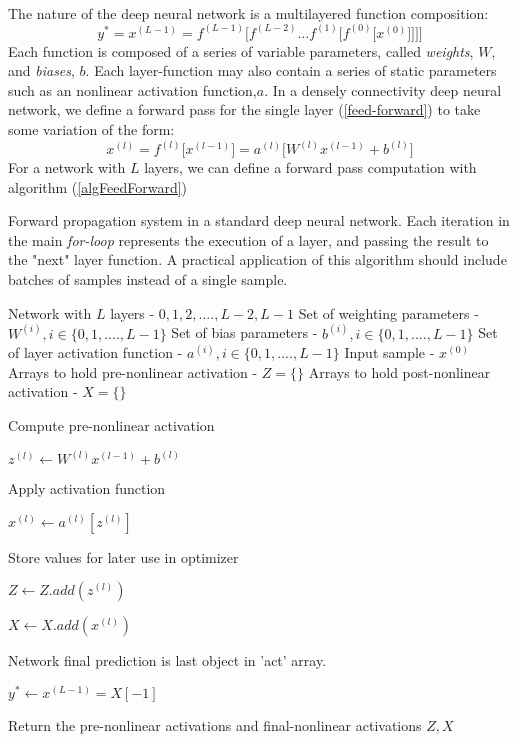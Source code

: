 \documentclass[12pt,letterpaper]{article}
\begin{document}
\paragraph*{}The nature of the deep neural network is a multilayered function composition:
\begin{equation}
\label{DNN Composition}
y^* = x^{(L-1)} = f^{(L-1)}\big[ f^{(L-2)}...f^{(1)}\big[f^{(0)}\big[ x^{(0)} \big]\big]\big]\big]
\end{equation}
Each function is composed of a series of variable parameters, called \textit{weights}, $W$, and \textit{biases}, $b$. Each layer-function may also contain a series of static parameters such as an nonlinear activation function,$a$. In a densely connectivity deep neural network, we define a forward pass for the single layer (\ref{feed-forward}) to take some variation of the form:
\begin{equation}
x^{(l)} = f^{(l)}\big[x^{(l-1)}\big] = a^{(l)} \big[ W^{(l)} x^{(l-1)} + b^{(l)} \big]
\end{equation}
For a network with $L$ layers, we can define a forward pass computation with algorithm (\ref{algFeedForward})

\begin{algorithm}[H]
\caption{Forward propagation system in a standard deep neural network. Each iteration in the main \textit{for-loop} represents the execution of a layer, and passing the result to the "next" layer function. A practical application of this algorithm should include batches of samples instead of a single sample.}
\label{algFeedForward}

\begin{algorithmic}
\REQUIRE Network with $L$ layers - $0,1,2,....,L-2,L-1$
\REQUIRE Set of weighting parameters - $W^{(i)}, i \in \{0,1,....,L-1\}$
\REQUIRE Set of bias parameters - $b^{(i)}, i \in \{0,1,....,L-1\}$
\REQUIRE Set of layer activation function - $a^{(i)}, i \in \{0,1,....,L-1\}$
\REQUIRE Input sample - $x^{(0)}$
\REQUIRE Arrays to hold pre-nonlinear activation - $Z = \{\}$
\REQUIRE Arrays to hold post-nonlinear activation - $X = \{\}$

	\item Compute pre-nonlinear activation
	\item $z^{(l)} \leftarrow W^{(l)}x^{(l-1)} + b^{(l)}$
	\item Apply activation function
	\item $x^{(l)} \leftarrow a^{(l)}[z^{(l)}]$
	\item Store values for later use in optimizer
	\item $Z \leftarrow Z.add(z^{(l)})$
	\item $X \leftarrow X.add(x^{(l)})$
\ENDFOR

\item Network final prediction is last object in 'act' array.
\item $y^* \leftarrow x^{(L-1)} = X[-1]$
\item Return the pre-nonlinear activations and final-nonlinear activations
\RETURN $Z , X$

\end{algorithmic}
\end{algorithm}
\end{document}

